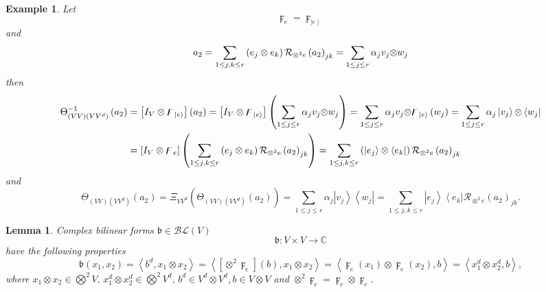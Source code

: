 \documentclass[aps,preprint]{revtex4}%
\newtheorem{example}[theorem]{Example}
\newtheorem{lemma}[theorem]{Lemma}
\begin{document}
\begin{example}
Let
\begin{equation}
\digamma_{e}=\digamma_{\left\vert e\right\rangle }%
\end{equation}
and
\begin{equation}
a_{2}=\sum_{1\leq j,k\leq r}\left(  e_{j}\otimes e_{k}\right)  \mathcal{R}%
_{\otimes^{2}e}\left(  a_{2}\right)  _{jk}=\sum_{1\leq j\leq r}\alpha_{j}%
v_{j}{\small \otimes}w_{j}%
\end{equation}
then
\begin{align}
\Theta_{\left(  VV\right)  \left(  VV^{d}\right)  }^{-1}\left(  a_{2}\right)
&  =\left[  I_{V}\otimes\digamma_{\left\vert e\right\rangle }\right]  \left(
a_{2}\right)  =\left[  I_{V}\otimes\digamma_{\left\vert e\right\rangle
}\right]  \left(  \sum_{1\leq j\leq r}\alpha_{j}v_{j}{\small \otimes}%
w_{j}\right)  =\sum_{1\leq j\leq r}\alpha_{j}v_{j}{\small \otimes}%
\digamma_{\left\vert e\right\rangle }\left(  w_{j}\right)  =\sum_{1\leq j\leq
r}\alpha_{j}\left\vert v_{j}\right\rangle {\small \otimes}\left\langle
w_{j}\right\vert \\
&  =\left[  I_{V}\otimes\digamma_{e}\right]  \left(  \sum_{1\leq j,k\leq
r}\left(  e_{j}\otimes e_{k}\right)  \mathcal{R}_{\otimes^{2}e}\left(
a_{2}\right)  _{jk}\right)  =\sum_{1\leq j,k\leq r}\left(  \left\vert
e_{j}\right\rangle \otimes\left\langle e_{k}\right\vert \right)
\mathcal{R}_{\otimes^{2}e}\left(  a_{2}\right)  _{jk}%
\end{align}
and
\begin{equation}
\Theta_{\left(  VV\right)  \left(  VV^{d}\right)  }\left(  a_{2}\right)
=\Xi_{VV^{d}}\left(  \Theta_{\left(  VV\right)  \left(  VV^{d}\right)
}\left(  a_{2}\right)  \right)  =\sum_{1\leq j\leq r}\alpha_{j}\left\vert
v_{j}\right\rangle \left\langle w_{j}\right\vert =\sum_{1\leq j,k\leq
r}\left\vert e_{j}\right\rangle \left\langle e_{k}\right\vert \mathcal{R}%
_{\otimes^{2}e}\left(  a_{2}\right)  _{jk}.
\end{equation}

\end{example}

\begin{lemma}
Complex bilinear forms $\mathfrak{b}\in\mathcal{BL}\left(  V\right)  $%
\begin{equation}
\mathfrak{b}:V\times V\rightarrow\mathbb{C}%
\end{equation}
have the following properties
\begin{equation}
\mathfrak{b}\left(  x_{1},x_{2}\right)  =\left\langle b^{d},x_{1}\otimes
x_{2}\right\rangle =\left\langle \left[  \otimes^{2}\digamma_{e}\right]
\left(  b\right)  ,x_{1}\otimes x_{2}\right\rangle =\left\langle \digamma
_{e}\left(  x_{1}\right)  \otimes\digamma_{e}\left(  x_{2}\right)
,b\right\rangle =\left\langle x_{1}^{d}\otimes x_{2}^{d},b\right\rangle ,
\end{equation}
where $x_{1}\otimes x_{2}\in\bigotimes\nolimits^{2}V,\,x_{1}^{d}\otimes
x_{2}^{d}\in\bigotimes\nolimits^{2}V^{d},\,b^{d}\in V^{d}\otimes V^{d}%
$,$\,b\in V\otimes V$ and $\otimes^{2}\digamma_{e}=\digamma_{e}\otimes
\digamma_{e}.$
\end{lemma}
\end{document}

